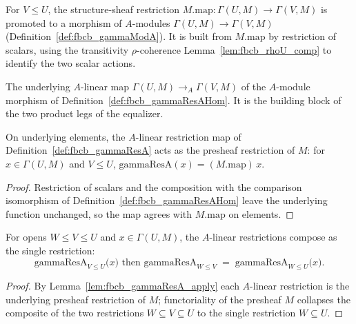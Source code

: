 \begin{definition}
  \label{def:fbcb_gammaResAHom}
  For \(V \le U\), the structure-sheaf restriction \(M.\mathrm{map} : \Gamma(U,M) \to \Gamma(V,M)\) is
  promoted to a morphism of \(A\)-modules \(\Gamma(U,M) \to \Gamma(V,M)\) (Definition~\ref{def:fbcb_gammaModA}).
  It is built from \(M.\mathrm{map}\) by restriction of scalars, using the transitivity
  \(\rho\)-coherence Lemma~\ref{lem:fbcb_rhoU_comp} to identify the two scalar actions.
\end{definition}

\begin{definition}
  \label{def:fbcb_gammaResA}
  The underlying \(A\)-linear map \(\Gamma(U,M) \to_A \Gamma(V,M)\) of the \(A\)-module morphism of
  Definition~\ref{def:fbcb_gammaResAHom}. It is the building block of the two product legs of the
  equalizer.
\end{definition}

\begin{lemma}
  \label{lem:fbcb_gammaResA_apply}
  On underlying elements, the \(A\)-linear restriction map of Definition~\ref{def:fbcb_gammaResA} acts
  as the presheaf restriction of \(M\): for \(x \in \Gamma(U,M)\) and \(V \le U\),
  \(\mathrm{gammaResA}(x) = (M.\mathrm{map})\,x\).
  \begin{proof}
    Restriction of scalars and the composition with the comparison isomorphism of
    Definition~\ref{def:fbcb_gammaResAHom} leave the underlying function unchanged, so the map agrees
    with \(M.\mathrm{map}\) on elements.
  \end{proof}
\end{lemma}

\begin{lemma}
  \label{lem:fbcb_gammaResA_comp}
  For opens \(W \le V \le U\) and \(x \in \Gamma(U,M)\), the \(A\)-linear restrictions compose as the
  single restriction:
  \[
    \mathrm{gammaResA}_{V \le U}\!\bigl(x\bigr) \text{ then } \mathrm{gammaResA}_{W \le V}
      \;=\; \mathrm{gammaResA}_{W \le U}\!\bigl(x\bigr).
  \]
  \begin{proof}
    By Lemma~\ref{lem:fbcb_gammaResA_apply} each \(A\)-linear restriction is the underlying presheaf
    restriction of \(M\); functoriality of the presheaf \(M\) collapses the composite of the two
    restrictions \(W \subseteq V \subseteq U\) to the single restriction \(W \subseteq U\).
  \end{proof}
\end{lemma}

